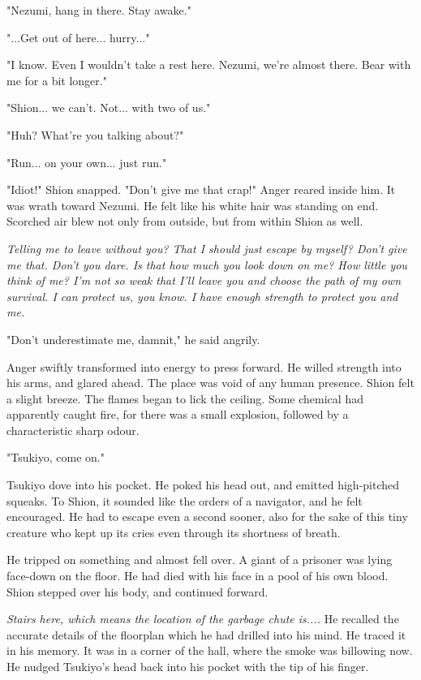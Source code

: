 "Nezumi, hang in there. Stay awake."

"...Get out of here... hurry..."

"I know. Even I wouldn't take a rest here. Nezumi, we're almost there.
Bear with me for a bit longer."

"Shion... we can't. Not... with two of us."

"Huh? What're you talking about?"

"Run... on your own... just run."

"Idiot!" Shion snapped. "Don't give me that crap!" Anger reared inside
him. It was wrath toward Nezumi. He felt like his white hair was
standing on end. Scorched air blew not only from outside, but from
within Shion as well.

\emph{Telling me to leave without you? That I should just escape by myself?
	Don't give me that. Don't you dare. Is that how much you look down on
	me? How little you think of me? I'm not so weak that I'll leave you and
	choose the path of my own survival. I can protect us, you know. I have
	enough strength to protect you and me.}

"Don't underestimate me, damnit," he said angrily.

Anger swiftly transformed into energy to press forward. He willed
strength into his arms, and glared ahead. The place was void of any
human presence. Shion felt a slight breeze. The flames began to lick the
ceiling. Some chemical had apparently caught fire, for there was a small
explosion, followed by a characteristic sharp odour.

"Tsukiyo, come on."

Tsukiyo dove into his pocket. He poked his head out, and emitted
high-pitched squeaks. To Shion, it sounded like the orders of a
navigator, and he felt encouraged. He had to escape even a second
sooner, also for the sake of this tiny creature who kept up its cries
even through its shortness of breath.

He tripped on something and almost fell over. A giant of a prisoner was
lying face-down on the floor. He had died with his face in a pool of his
own blood. Shion stepped over his body, and continued forward.

\emph{Stairs here, which means the location of the garbage chute is....} He
recalled the accurate details of the floorplan which he had drilled into
his mind. He traced it in his memory. It was in a corner of the hall,
where the smoke was billowing now. He nudged Tsukiyo's head back into
his pocket with the tip of his finger.

